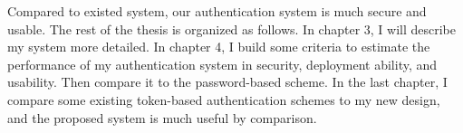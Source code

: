 \begin{CJK}{Bg5}{bsmi}
Compared to existed system, our authentication system is much secure and usable. The rest of the thesis is organized as follows. In chapter 3, I will describe my system more detailed. In chapter 4, I build some criteria to estimate the performance of my authentication system in security, deployment ability, and usability. Then compare it to the password-based scheme. In the last chapter, I compare some existing token-based authentication schemes to my new design, and the proposed system is much useful by comparison.

\end{CJK}
